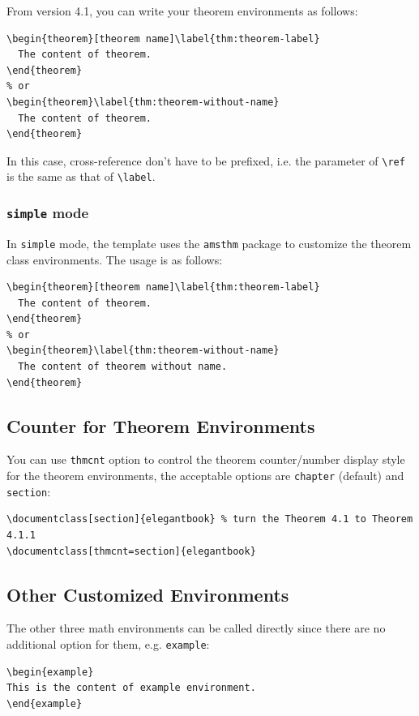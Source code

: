 \documentclass[11pt,bibend=bibtex]{elegantbook}
\begin{document}
From version 4.1, you can write your theorem environments as follows:
\begin{lstlisting}
\begin{theorem}[theorem name]\label{thm:theorem-label}
  The content of theorem.
\end{theorem}
% or
\begin{theorem}\label{thm:theorem-without-name}
  The content of theorem.
\end{theorem}
\end{lstlisting}

In this case, cross-reference don't have to be prefixed, i.e. the parameter of \lstinline{\ref} is the same as that of \lstinline{\label}.
 
\subsubsection{\lstinline{simple} mode}

In \lstinline{simple} mode, the template uses the \lstinline{amsthm} package to customize the theorem class environments. The usage is as follows:

\begin{lstlisting}
\begin{theorem}[theorem name]\label{thm:theorem-label}
  The content of theorem.
\end{theorem}
% or 
\begin{theorem}\label{thm:theorem-without-name}
  The content of theorem without name.
\end{theorem}
\end{lstlisting}

\subsection{Counter for Theorem Environments}

You can use \lstinline{thmcnt} option to control the theorem counter/number display style for the theorem environments, the acceptable options are \lstinline{chapter} (default) and \lstinline{section}:

\begin{lstlisting}
\documentclass[section]{elegantbook} % turn the Theorem 4.1 to Theorem 4.1.1 
\documentclass[thmcnt=section]{elegantbook}
\end{lstlisting}


\subsection{Other Customized Environments}
The other three math environments can be called directly since there are no additional option for them, e.g. \lstinline{example}:
\begin{lstlisting}
\begin{example}
This is the content of example environment.
\end{example}
\end{lstlisting}
\end{document}

